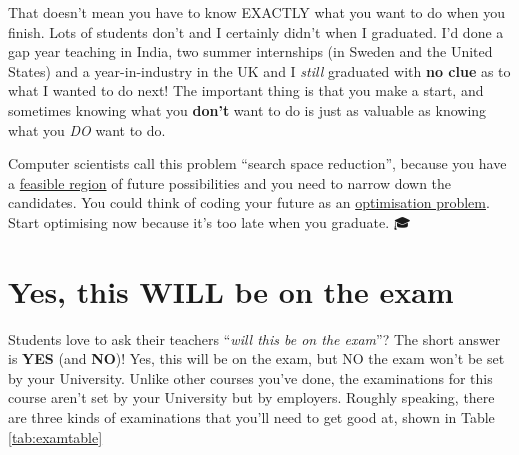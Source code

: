 \documentclass[
]{book}
\begin{document}
That doesn't mean you have to know EXACTLY what you want to do when you finish. Lots of students don't and I certainly didn't when I graduated. I'd done a gap year teaching in India, two summer internships (in Sweden and the United States) and a year-in-industry in the UK and I \emph{still} graduated with \textbf{no clue} as to what I wanted to do next! The important thing is that you make a start, and sometimes knowing what you \textbf{don't} want to do is just as valuable as knowing what you \emph{DO} want to do.

Computer scientists call this problem ``search space reduction'', \citep{searchspace} because you have a \href{https://en.wikipedia.org/wiki/Feasible_region}{feasible region} of future possibilities and you need to narrow down the candidates. You could think of coding your future as an \href{https://en.wikipedia.org/wiki/Optimization_problem}{optimisation problem}. Start optimising now because it's too late when you graduate. 🎓

\hypertarget{exams}{%
\section{Yes, this WILL be on the exam}\label{exams}}

Students love to ask their teachers ``\emph{will this be on the exam}''? The short answer is \textbf{YES} (and \textbf{NO})! Yes, this will be on the exam, but NO the exam won't be set by your University. Unlike other courses you've done, the examinations for this course aren't set by your University but by employers. Roughly speaking, there are three kinds of examinations that you'll need to get good at, shown in Table \ref{tab:examtable}
\end{document}
